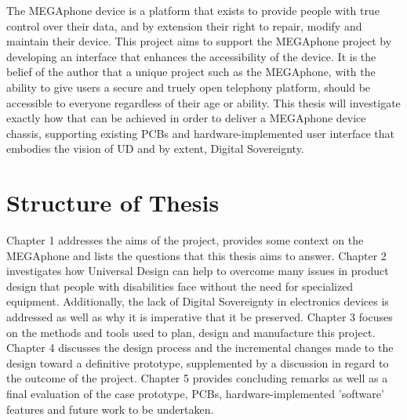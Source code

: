 The MEGAphone device is a platform that exists to provide people with true control over their data, and by extension their right to repair, modify and maintain their device.
This project aims to support the MEGAphone project by developing an interface that enhances the accessibility of the device.
It is the belief of the author that a unique project such as the MEGAphone, with the ability to give users a secure and truely open telephony platform, should be accessible to everyone regardless of their age or ability.
This thesis will investigate exactly how that can be achieved in order to deliver a MEGAphone device chassis, supporting existing PCBs and hardware-implemented user interface that embodies the vision of UD and by extent, Digital Sovereignty. %




\section{Structure of Thesis}

Chapter 1 addresses the aims of the project, provides some context on the MEGAphone and lists the questions that this thesis aims to answer.
Chapter 2 investigates how Universal Design can help to overcome many issues in product design that people with disabilities face without the need for specialized equipment. 
Additionally, the lack of Digital Sovereignty in electronics devices is addressed as well as why it is imperative that it be preserved.
Chapter 3 focuses on the methods and tools used to plan, design and manufacture this project.
Chapter 4 discusses the design process and the incremental changes made to the design toward a definitive prototype, supplemented by a discussion in regard to the outcome of the project. 
Chapter 5 provides concluding remarks as well as a final evaluation of the case prototype, PCBs, hardware-implemented 'software' features and future work to be undertaken.
